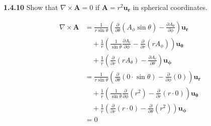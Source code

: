 \documentclass{article}
\begin{document}
\textbf{1.4.10} Show that $\nabla \times \mathbf{A} = 0$ if $\mathbf{A} = r^2 \mathbf{u_r}$ in spherical coordinates.

\begin{equation*}
	\begin{split}
		\nabla \times \mathbf{A} & = \frac{1}{r\sin\theta} \left(\frac{\partial}{\partial \theta}(A_\phi \sin\theta) - \frac{\partial A_\theta}{\partial \phi}\right) \mathbf{u_r} \\
		& \quad + \frac{1}{r} \left(\frac{1}{\sin\theta}\frac{\partial A_r}{\partial \phi} - \frac{\partial}{\partial r}(rA_\phi)\right) \mathbf{u_\theta} \\
		& \quad + \frac{1}{r} \left(\frac{\partial}{\partial r}(rA_\theta) - \frac{\partial A_r}{\partial \theta}\right) \mathbf{u_\phi} \\
		& = \frac{1}{r\sin\theta} \left(\frac{\partial}{\partial \theta}(0 \cdot \sin\theta) - \frac{\partial}{\partial \phi}(0)\right) \mathbf{u_r} \\
		& \quad + \frac{1}{r} \left(\frac{1}{\sin\theta}\frac{\partial}{\partial \phi}(r^2) - \frac{\partial}{\partial r}(r \cdot 0)\right) \mathbf{u_\theta} \\
		& \quad + \frac{1}{r} \left(\frac{\partial}{\partial r}(r \cdot 0) - \frac{\partial}{\partial \theta}(r^2)\right) \mathbf{u_\phi} \\
		& = 0
	\end{split}
\end{equation*}
\end{document}
